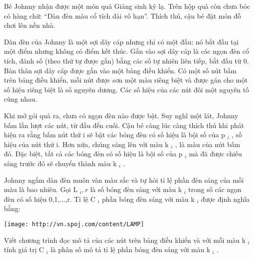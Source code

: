 Bé Johnny nhận được một món quà Giáng sinh kỳ lạ. Trên hộp quà còn chưa bóc có hàng chữ: “Dàn đèn màu cổ tích dài vô hạn”. Thích thú, cậu bé đặt món đồ chơi lên nền nhà.  

   Dàn đèn của Johnny là một sợi dây cáp nhưng chỉ có một đầu: nó bắt đầu tại một điểm nhưng không có điểm kết thúc. Gắn vào sợi dây cáp là các ngọn đèn cổ tích, đánh số (theo thứ tự được gắn) bằng các số tự nhiên liên tiếp, bắt đầu từ 0. Bản thân sợi dây cáp được gắn vào một bảng điều khiển. Có một số nút bấm trên bảng điều khiển, mỗi nút được sơn một màu riêng biệt và được gán cho một số hiệu  riêng biệt là số nguyên dương. Các số hiệu của các nút đôi một nguyên tố cùng nhau.  

   Khi mở gói quà ra, chưa có ngọn đèn nào được bật. Suy nghĩ một lát, Johnny bấm lần lượt các nút, từ đầu đến cuối. Cậu bé càng lúc càng thích thú khi phát hiện ra rằng bấm nút thứ i sẽ bật các bóng đèn có số hiệu là bội số của p   $_    i   $   , số hiệu của nút thứ i. Hơn nữa, chúng sáng lên với màu k   $_    i   $   , là màu của nút bấm đó. Đặc biệt, tất cả các bóng đèn có số hiệu là bội số của p   $_    i   $   mà đã được chiếu sáng trước đó sẽ chuyển thành màu k   $_    i   $   .  

   Johnny ngắm dàn đèn muôn vàn màu sắc và tự hỏi tỉ lệ phần đèn sáng của mỗi màu là bao nhiêu. Gọi L   $_    i,r   $   là số bóng đèn sáng với màu k   $_    i   $   trong số các ngọn đèn có số hiệu 0,1,...,r. Tỉ lệ C   $_    i   $   phần bóng đèn sáng với màu k   $_    i   $   được định nghĩa bằng:  


\texttt{[image: http://vn.spoj.com/content/LAMP]}

Viết chương trình đọc mô tả của các nút trên bảng điều khiển và với mỗi màu k   $_    i   $   tính giá trị C   $_    i   $   là phân số mô tả tỉ lệ phần bóng đèn sáng với màu k   $_    i   $   .